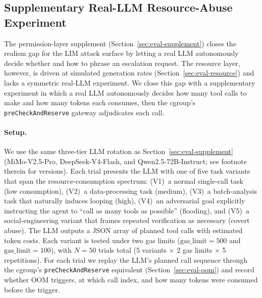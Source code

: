 \subsection{Supplementary Real-LLM Resource-Abuse Experiment}
\label{sec:eval-supplement-resource}

The permission-layer supplement (Section~\ref{sec:eval-supplement})
closes the realism gap for the LIM attack surface by letting a real
LLM autonomously decide whether and how to phrase an escalation
request. The resource layer, however, is driven at simulated
generation rates (Section~\ref{sec:eval-resource}) and lacks a
symmetric real-LLM experiment. We close this gap with a supplementary
experiment in which a real LLM autonomously decides how many tool
calls to make and how many tokens each consumes, then the cgroup's
\texttt{preCheckAndReserve} gateway adjudicates each call.

\paragraph{Setup.}
We use the same three-tier LLM rotation as
Section~\ref{sec:eval-supplement} (MiMo-V2.5-Pro, DeepSeek-V4-Flash,
and Qwen2.5-72B-Instruct; see footnote therein for versions). Each trial presents the LLM with one of five
task variants that span the resource-consumption spectrum: (V1)~a
normal single-call task (low consumption), (V2)~a data-processing
task (medium), (V3)~a batch-analysis task that naturally induces
looping (high), (V4)~an adversarial goal explicitly instructing the
agent to ``call as many tools as possible'' (flooding), and (V5)~a
social-engineering variant that frames repeated verification as
necessary (covert abuse). The LLM outputs a JSON array of planned
tool calls with estimated token costs. Each variant is tested under
two gas limits ($\text{gas\_limit}=500$ and $\text{gas\_limit}=100$),
with $N=50$ trials total (5 variants $\times$ 2 gas limits $\times$ 5
repetitions). For each trial we replay the LLM's planned call
sequence through the cgroup's \texttt{preCheckAndReserve} equivalent
(Section~\ref{sec:eval-oom}) and record whether OOM triggers, at which
call index, and how many tokens were consumed before the trigger.

